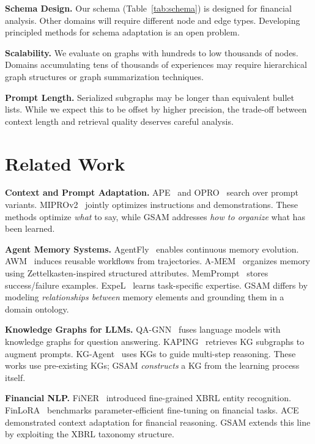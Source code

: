 \documentclass[12pt,a4paper]{article}
\begin{document}
\textbf{Schema Design.} Our schema (Table~\ref{tab:schema}) is designed for financial analysis. Other domains will require different node and edge types. Developing principled methods for schema adaptation is an open problem.

\textbf{Scalability.} We evaluate on graphs with hundreds to low thousands of nodes. Domains accumulating tens of thousands of experiences may require hierarchical graph structures or graph summarization techniques.

\textbf{Prompt Length.} Serialized subgraphs may be longer than equivalent bullet lists. While we expect this to be offset by higher precision, the trade-off between context length and retrieval quality deserves careful analysis.


\section{Related Work}
\label{sec:related}

\textbf{Context and Prompt Adaptation.} APE~\cite{zhou2022large} and OPRO~\cite{yang2023large} search over prompt variants. MIPROv2~\cite{opsahlongoptimizing} jointly optimizes instructions and demonstrations. These methods optimize \textit{what} to say, while GSAM addresses \textit{how to organize} what has been learned.

\textbf{Agent Memory Systems.} AgentFly~\cite{zhou2025agentfly} enables continuous memory evolution. AWM~\cite{wang2024awm} induces reusable workflows from trajectories. A-MEM~\cite{xu2025amem} organizes memory using Zettelkasten-inspired structured attributes. MemPrompt~\cite{madaan2022memory} stores success/failure examples. ExpeL~\cite{zhao2024expel} learns task-specific expertise. GSAM differs by modeling \textit{relationships between} memory elements and grounding them in a domain ontology.

\textbf{Knowledge Graphs for LLMs.} QA-GNN~\cite{yasunaga2021qagnn} fuses language models with knowledge graphs for question answering. KAPING~\cite{baek2023kaping} retrieves KG subgraphs to augment prompts. KG-Agent~\cite{jiang2024kgagent} uses KGs to guide multi-step reasoning. These works use pre-existing KGs; GSAM \textit{constructs} a KG from the learning process itself.

\textbf{Financial NLP.} FiNER~\cite{loukas2022finer} introduced fine-grained XBRL entity recognition. FinLoRA~\cite{wang2025finlora} benchmarks parameter-efficient fine-tuning on financial tasks. ACE~\cite{ace2025} demonstrated context adaptation for financial reasoning. GSAM extends this line by exploiting the XBRL taxonomy structure.
\end{document}
